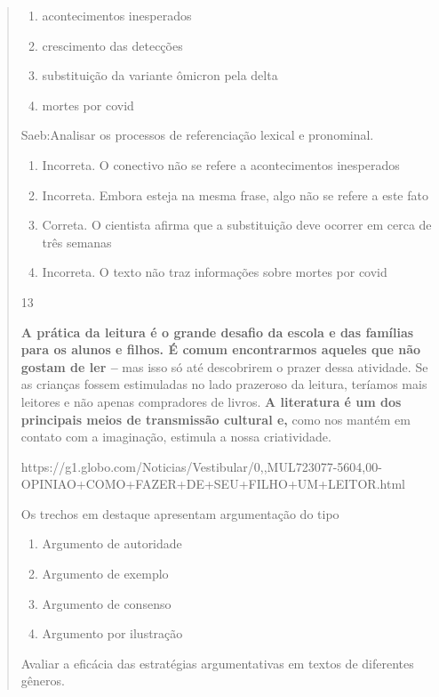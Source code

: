 {\begin{quote}
{\begin{itemize}
\begin{itemize}
\begin{enumerate}

\item
  acontecimentos inesperados
\item
  crescimento das detecções
\item
  substituição da variante ômicron pela delta
\item
  mortes por covid
\end{enumerate}

Saeb:Analisar os processos de referenciação lexical e pronominal.

\begin{enumerate}
\def\labelenumi{\arabic{enumi}.}
\item
  Incorreta. O conectivo não se refere a acontecimentos inesperados
\item
  Incorreta. Embora esteja na mesma frase, algo não se refere a este
  fato
\item
  Correta. O cientista afirma que a substituição deve ocorrer em cerca
  de três semanas
\item
  Incorreta. O texto não traz informações sobre mortes por covid
\end{enumerate}

\num{13}

\textbf{A prática da leitura é o grande desafio da escola e das famílias
para os alunos e filhos. É comum encontrarmos aqueles que não gostam de
ler --} mas isso só até descobrirem o prazer dessa atividade. Se as
crianças fossem estimuladas no lado prazeroso da leitura, teríamos mais
leitores e não apenas compradores de livros. \textbf{A literatura é um
dos principais meios de transmissão cultural e,} como nos mantém em
contato com a imaginação, estimula a nossa criatividade.

https://g1.globo.com/Noticias/Vestibular/0,,MUL723077-5604,00-OPINIAO+COMO+FAZER+DE+SEU+FILHO+UM+LEITOR.html

Os trechos em destaque apresentam argumentação do tipo

\begin{enumerate}

\item
  Argumento de autoridade
\item
  Argumento de exemplo
\item
  Argumento de consenso
\item
  Argumento por ilustração
\end{enumerate}

Avaliar a eficácia das estratégias argumentativas em textos de
diferentes gêneros.


\end{itemize}
\end{itemize}}
\end{quote}}
